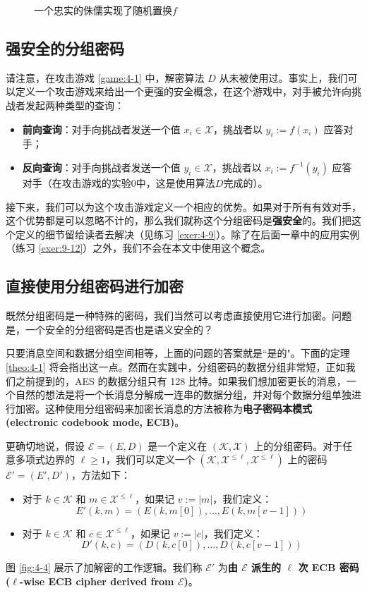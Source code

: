 \begin{figure}
  \centering
  
  \caption{一个忠实的侏儒实现了随机置换$f$}
  \label{fig:4-3}
\end{figure}

\subsection{强安全的分组密码}\label{subsec:4-1-3}

请注意，在攻击游戏 \ref{game:4-1} 中，解密算法 $D$ 从未被使用过。事实上，我们可以定义一个攻击游戏来给出一个更强的安全概念，在这个游戏中，对手被允许向挑战者发起两种类型的查询：
\begin{itemize}
	\item \textbf{前向查询}：对手向挑战者发送一个值 $x_i\in\mathcal{X}$，挑战者以 $y_i:=f(x_i)$ 应答对手；
	\item \textbf{反向查询}：对手向挑战者发送一个值 $y_i\in\mathcal{X}$，挑战者以 $x_i:=f^{-1}(y_i)$ 应答对手（在攻击游戏的实验$0$中，这是使用算法$D$完成的）。
\end{itemize}
接下来，我们可以为这个攻击游戏定义一个相应的优势。如果对于所有有效对手，这个优势都是可以忽略不计的，那么我们就称这个分组密码是\textbf{强安全}的。我们把这个定义的细节留给读者去解决（见练习 \ref{exer:4-9}）。除了在后面一章中的应用实例（练习 \ref{exer:9-12}）之外，我们不会在本文中使用这个概念。

\subsection{直接使用分组密码进行加密}\label{subsec:4-1-4}

既然分组密码是一种特殊的密码，我们当然可以考虑直接使用它进行加密。问题是，一个安全的分组密码是否也是语义安全的？

只要消息空间和数据分组空间相等，上面的问题的答案就是``是的"。下面的定理 \ref{theo:4-1} 将会指出这一点。然而在实践中，分组密码的数据分组非常短，正如我们之前提到的，AES 的数据分组只有 128 比特。如果我们想加密更长的消息，一个自然的想法是将一个长消息分解成一连串的数据分组，并对每个数据分组单独进行加密。这种使用分组密码来加密长消息的方法被称为\textbf{电子密码本模式 (electronic codebook mode, ECB)}。

更确切地说，假设 $\mathcal{E}=(E,D)$ 是一个定义在 $(\mathcal{K},\mathcal{X})$ 上的分组密码。对于任意多项式边界的 $\ell\geq1$，我们可以定义一个 $(\mathcal{K},\mathcal{X}^{\leq\ell},\mathcal{X}^{\leq\ell})$ 上的密码 $\mathcal{E}'=(E',D')$，方法如下：
\begin{itemize}
	\item 对于 $k\in\mathcal{K}$ 和 $m\in\mathcal{X}^{\leq\ell}$，如果记 $v:=|m|$，我们定义：
	\[
    E'(k,m)=(E(k,m[0]),\dots,E(k,m[v-1]))
    \]
	\item 对于 $k\in\mathcal{K}$ 和 $c\in\mathcal{X}^{\leq\ell}$，如果记 $v:=|c|$，我们定义：
	\[
	D'(k,c)=(D(k,c[0]),\dots,D(k,c[v-1]))
	\]
\end{itemize}
图 \ref{fig:4-4} 展示了加解密的工作逻辑。我们称 $\mathcal{E}'$ 为\textbf{由 $\mathcal{E}$ 派生的 $\ell$ 次 ECB 密码 ($\ell$-wise ECB cipher derived from $\mathcal{E}$)}。

